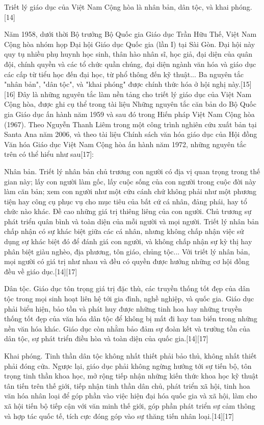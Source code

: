 \documentclass[../thesis.tex]{subfiles}
\begin{document}
Triết lý giáo dục của Việt Nam Cộng hòa là nhân bản, dân tộc, và khai phóng.[14]

Năm 1958, dưới thời Bộ trưởng Bộ Quốc gia Giáo dục Trần Hữu Thế, Việt Nam Cộng hòa nhóm họp Đại hội Giáo dục Quốc gia (lần I) tại Sài Gòn. Đại hội này quy tụ nhiều phụ huynh học sinh, thân hào nhân sĩ, học giả, đại diện của quân đội, chính quyền và các tổ chức quần chúng, đại diện ngành văn hóa và giáo dục các cấp từ tiểu học đến đại học, từ phổ thông đến kỹ thuật... Ba nguyên tắc "nhân bản", "dân tộc", và "khai phóng" được chính thức hóa ở hội nghị này.[15][16] Đây là những nguyên tắc làm nền tảng cho triết lý giáo dục của Việt Nam Cộng hòa, được ghi cụ thể trong tài liệu Những nguyên tắc căn bản do Bộ Quốc gia Giáo dục ấn hành năm 1959 và sau đó trong Hiến pháp Việt Nam Cộng hòa (1967). Theo Nguyễn Thanh Liêm trong một công trình nghiên cứu xuất bản tại Santa Ana năm 2006, và theo tài liệu Chính sách văn hóa giáo dục của Hội đồng Văn hóa Giáo dục Việt Nam Cộng hòa ấn hành năm 1972, những nguyên tắc trên có thể hiểu như sau[17]:

Nhân bản. Triết lý nhân bản chủ trương con người có địa vị quan trọng trong thế gian này; lấy con người làm gốc, lấy cuộc sống của con người trong cuộc đời này làm căn bản; xem con người như một cứu cánh chứ không phải như một phương tiện hay công cụ phục vụ cho mục tiêu của bất cứ cá nhân, đảng phái, hay tổ chức nào khác. Đề cao những giá trị thiêng liêng của con người. Chủ trương sự phát triển quân bình và toàn diện của mỗi người và mọi người. Triết lý nhân bản chấp nhận có sự khác biệt giữa các cá nhân, nhưng không chấp nhận việc sử dụng sự khác biệt đó để đánh giá con người, và không chấp nhận sự kỳ thị hay phân biệt giàu nghèo, địa phương, tôn giáo, chủng tộc... Với triết lý nhân bản, mọi người có giá trị như nhau và đều có quyền được hưởng những cơ hội đồng đều về giáo dục.[14][17]

Dân tộc. Giáo dục tôn trọng giá trị đặc thù, các truyền thống tốt đẹp của dân tộc trong mọi sinh hoạt liên hệ tới gia đình, nghề nghiệp, và quốc gia. Giáo dục phải biểu hiện, bảo tồn và phát huy được những tinh hoa hay những truyền thống tốt đẹp của văn hóa dân tộc để không bị mất đi hay tan biến trong những nền văn hóa khác. Giáo dục còn nhằm bảo đảm sự đoàn kết và trường tồn của dân tộc, sự phát triển điều hòa và toàn diện của quốc gia.[14][17]

Khai phóng. Tinh thần dân tộc không nhất thiết phải bảo thủ, không nhất thiết phải đóng cửa. Ngược lại, giáo dục phải không ngừng hướng tới sự tiến bộ, tôn trọng tinh thần khoa học, mở rộng tiếp nhận những kiến thức khoa học kỹ thuật tân tiến trên thế giới, tiếp nhận tinh thần dân chủ, phát triển xã hội, tinh hoa văn hóa nhân loại để góp phần vào việc hiện đại hóa quốc gia và xã hội, làm cho xã hội tiến bộ tiếp cận với văn minh thế giới, góp phần phát triển sự cảm thông và hợp tác quốc tế, tích cực đóng góp vào sự thăng tiến nhân loại.[14][17]
\end{document}
